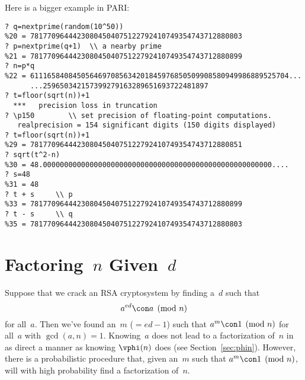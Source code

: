 \documentclass[11pt]{report}
\begin{document}

Here is a bigger example in PARI:
\begin{verbatim}
? q=nextprime(random(10^50))
%20 = 78177096444230804504075122792410749354743712880803
? p=nextprime(q+1)  \\ a nearby prime
%21 = 78177096444230804504075122792410749354743712880899
? n=p*q
%22 = 6111658408450564697085634201845976850509908580949986889525704...
      ...259650342157399279163289651693722481897
? t=floor(sqrt(n))+1
  ***   precision loss in truncation
? \p150        \\ set precision of floating-point computations.
   realprecision = 154 significant digits (150 digits displayed)
? t=floor(sqrt(n))+1
%29 = 78177096444230804504075122792410749354743712880851
? sqrt(t^2-n)
%30 = 48.000000000000000000000000000000000000000000000000000000....
? s=48
%31 = 48
? t + s     \\ p
%33 = 78177096444230804504075122792410749354743712880899
? t - s     \\ q
%35 = 78177096444230804504075122792410749354743712880803
\end{verbatim}

\section{Factoring~$n$ Given~$d$}
Suppose that we crack an RSA cryptosystem by
finding a~$d$ such that
$$
  a^{ed} \con a\pmod{n}
$$
for all~$a$.  Then we've found an~$m$ ($=ed-1$) such that
$a^m\con 1\pmod{n}$ for all~$a$ with $\gcd(a,n)=1$.
Knowing~$a$ does not lead to a factorization of~$n$
in as direct a manner as knowing $\vphi(n)$ does (see
Section~\ref{sec:phin}).  However, there is a probabilistic
procedure that, given an~$m$ such that $a^m\con 1\pmod{n}$,
will with high probability find a factorization of~$n$.
\end{document}
